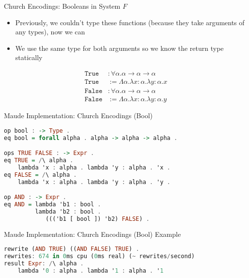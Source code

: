 \documentclass[leqno,presentation,usenames,dvipsnames]{beamer}
\begin{document}
\begin{frame}[fragile]{Church Encodings: Booleans in System $F$}
    \begin{itemize}
        \item Previously, we couldn't type these functions (because they take arguments of any types), now we can
        \item We use the same type for both arguments so we know the return type statically
    \end{itemize}
\begin{align*}
    \texttt{True} & : \forall \alpha. \alpha \to \alpha \to \alpha \\
    \texttt{True} & := \Lambda \alpha. \lambda x : \alpha. \lambda y : \alpha. x \\
    \texttt{False} & : \forall \alpha. \alpha \to \alpha \to \alpha \\
    \texttt{False} & := \Lambda \alpha. \lambda x : \alpha. \lambda y : \alpha. y
\end{align*}
\end{frame}

\begin{frame}[fragile]{Maude Implementation: Church Encodings (Bool)}

\footnotesize
\begin{lstlisting}[language=haskell, basicstyle=\small\ttfamily]
op bool : -> Type .
eq bool = forall alpha . alpha -> alpha -> alpha .

ops TRUE FALSE : -> Expr .
eq TRUE = /\ alpha .
    lambda 'x : alpha . lambda 'y : alpha . 'x .
eq FALSE = /\ alpha .
    lambda 'x : alpha . lambda 'y : alpha . 'y .

op AND : -> Expr .
eq AND = lambda 'b1 : bool .
         lambda 'b2 : bool .
            ((('b1 [ bool ]) 'b2) FALSE) .
\end{lstlisting}
\end{frame}

\begin{frame}[fragile]{Maude Implementation: Church Encodings (Bool) Example}
\footnotesize
\begin{lstlisting}[language=haskell, basicstyle=\small\ttfamily]
rewrite (AND TRUE) ((AND FALSE) TRUE) .
rewrites: 674 in 0ms cpu (0ms real) (~ rewrites/second)
result Expr: /\ alpha .
    lambda '0 : alpha . lambda '1 : alpha . '1
\end{lstlisting}
\end{frame}
\end{document}
